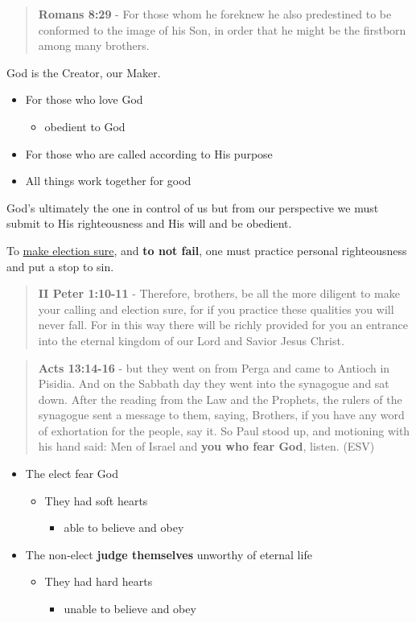 \documentclass[11pt]{article}
\begin{document}
\begin{quote}
\textbf{Romans 8:29} - For those whom he foreknew he also predestined to be conformed to the image of his Son, in order that he might be the firstborn among many brothers.
\end{quote}

God is the Creator, our Maker.

\begin{itemize}
\item For those who love God
\begin{itemize}
\item obedient to God
\end{itemize}
\item For those who are called according to His purpose
\item All things work together for good
\end{itemize}

God's ultimately the one in control of us but from our perspective we must submit to His righteousness and His will and be obedient.

To \uline{make election sure}, and \textbf{to not fail}, one must practice personal righteousness and put a stop to sin.

\begin{quote}
\textbf{II Peter 1:10-11} - Therefore, brothers, be all the more diligent to make your calling and election sure, for if you practice these qualities you will never fall. For in this way there will be richly provided for you an entrance into the eternal kingdom of our Lord and Savior Jesus Christ.
\end{quote}

\begin{quote}
\textbf{Acts 13:14-16} - but they went on from Perga and came to Antioch in Pisidia.  And on the Sabbath day they went into the synagogue and sat down.  After the reading from the Law and the Prophets, the rulers of the synagogue sent a message to them, saying, Brothers, if you have any word of exhortation for the people, say it.  So Paul stood up, and motioning with his hand said: Men of Israel and \textbf{you who fear God}, listen.  (ESV)
\end{quote}

\begin{itemize}
\item The elect fear God
\begin{itemize}
\item They had soft hearts
\begin{itemize}
\item able to believe and obey
\end{itemize}
\end{itemize}
\item The non-elect \textbf{judge themselves} unworthy of eternal life
\begin{itemize}
\item They had hard hearts
\begin{itemize}
\item unable to believe and obey
\end{itemize}
\end{itemize}
\end{itemize}
\end{document}
